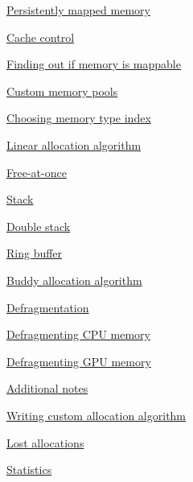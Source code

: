 \begin{DoxyItemize}
\begin{DoxyItemize}
\begin{DoxyItemize}
\item \hyperlink{memory_mapping_memory_mapping_persistently_mapped_memory}{Persistently mapped memory}
\item \hyperlink{memory_mapping_memory_mapping_cache_control}{Cache control}
\item \hyperlink{memory_mapping_memory_mapping_finding_if_memory_mappable}{Finding out if memory is mappable}
\end{DoxyItemize}
\item \hyperlink{custom_memory_pools}{Custom memory pools}
\begin{DoxyItemize}
\item \hyperlink{custom_memory_pools_custom_memory_pools_MemTypeIndex}{Choosing memory type index}
\item \hyperlink{custom_memory_pools_linear_algorithm}{Linear allocation algorithm}
\begin{DoxyItemize}
\item \hyperlink{custom_memory_pools_linear_algorithm_free_at_once}{Free-\/at-\/once}
\item \hyperlink{custom_memory_pools_linear_algorithm_stack}{Stack}
\item \hyperlink{custom_memory_pools_linear_algorithm_double_stack}{Double stack}
\item \hyperlink{custom_memory_pools_linear_algorithm_ring_buffer}{Ring buffer}
\end{DoxyItemize}
\item \hyperlink{custom_memory_pools_buddy_algorithm}{Buddy allocation algorithm}
\end{DoxyItemize}
\item \hyperlink{defragmentation}{Defragmentation}
\begin{DoxyItemize}
\item \hyperlink{defragmentation_defragmentation_cpu}{Defragmenting C\+PU memory}
\item \hyperlink{defragmentation_defragmentation_gpu}{Defragmenting G\+PU memory}
\item \hyperlink{defragmentation_defragmentation_additional_notes}{Additional notes}
\item \hyperlink{defragmentation_defragmentation_custom_algorithm}{Writing custom allocation algorithm}
\end{DoxyItemize}
\item \hyperlink{lost_allocations}{Lost allocations}
\item \hyperlink{statistics}{Statistics}
\begin{DoxyItemize}

\end{DoxyItemize}
\end{DoxyItemize}
\end{DoxyItemize}
